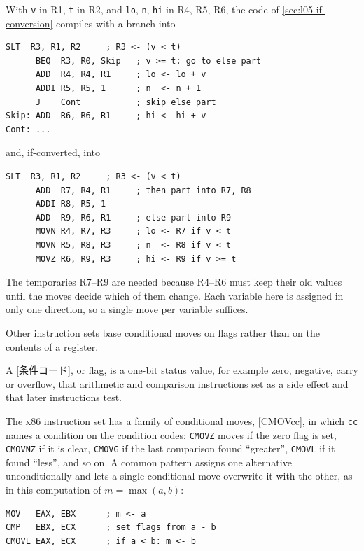 \documentclass[../main.tex]{subfiles}
\begin{document}
\begin{example}
  \label{ex:l05-movzn}
  With \texttt{v} in R1, \texttt{t} in R2, and \texttt{lo}, \texttt{n},
  \texttt{hi} in R4, R5, R6, the code of \cref{sec:l05-if-conversion}
  compiles with a branch into
  \begin{lstlisting}[language={[x86masm]Assembler}, numbers=none]
      SLT  R3, R1, R2     ; R3 <- (v < t)
      BEQ  R3, R0, Skip   ; v >= t: go to else part
      ADD  R4, R4, R1     ; lo <- lo + v
      ADDI R5, R5, 1      ; n  <- n + 1
      J    Cont           ; skip else part
Skip: ADD  R6, R6, R1     ; hi <- hi + v
Cont: ...
\end{lstlisting}
  and, if-converted, into
  \begin{lstlisting}[language={[x86masm]Assembler}, numbers=none]
      SLT  R3, R1, R2     ; R3 <- (v < t)
      ADD  R7, R4, R1     ; then part into R7, R8
      ADDI R8, R5, 1
      ADD  R9, R6, R1     ; else part into R9
      MOVN R4, R7, R3     ; lo <- R7 if v < t
      MOVN R5, R8, R3     ; n  <- R8 if v < t
      MOVZ R6, R9, R3     ; hi <- R9 if v >= t
\end{lstlisting}
  The temporaries R7--R9 are needed because R4--R6 must keep their old
  values until the moves decide which of them change.  Each variable here is
  assigned in only one direction, so a single move per variable suffices.
\end{example}

Other instruction sets base conditional moves on flags rather than on the
contents of a register.

\begin{definition}
  \label{def:l05-condition-code}
  A [条件コード], or flag, is a one-bit status value, for
  example zero, negative, carry or overflow, that arithmetic and comparison
  instructions set as a side effect and that later instructions test.
\end{definition}

The x86 instruction set has a family of conditional moves,
[CMOVcc], in which \texttt{cc} names a condition on the condition
codes: \texttt{CMOVZ} moves if the zero flag is set, \texttt{CMOVNZ} if it is
clear, \texttt{CMOVG} if the last comparison found \enquote{greater},
\texttt{CMOVL} if it found \enquote{less}, and so on.  A common pattern
assigns one alternative unconditionally and lets a single conditional move
overwrite it with the other, as in this computation of $m = \max(a,b)$:
\begin{lstlisting}[language={[x86masm]Assembler}, numbers=none]
MOV   EAX, EBX      ; m <- a
CMP   EBX, ECX      ; set flags from a - b
CMOVL EAX, ECX      ; if a < b: m <- b
\end{lstlisting}
\end{document}

